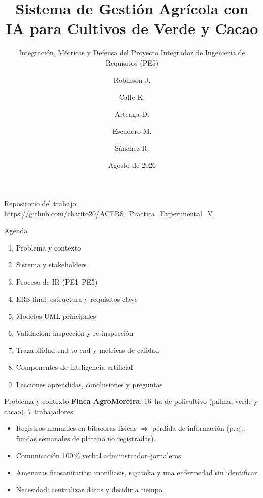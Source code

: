 \documentclass[12pt,aspectratio=169]{beamer}
\title[Defensa PFC AgroMoreira --- PE5]{Sistema de Gesti\'on Agr\'icola con IA para Cultivos de Verde y Cacao}
\subtitle{Integraci\'on, M\'etricas y Defensa del Proyecto Integrador de Ingenier\'ia de Requisitos (PE5)}
\author[Equipo ACERS]{Robinson J. \and Calle K. \and Arteaga D. \and Escudero M. \and S\'anchez R.}
\institute[UTEQ ISR-401]{Universidad T\'ecnica Estatal de Quevedo\\Ingenier\'ia de Requerimientos (ISR-401) --- 2026--2027 PPA}
\date{Agosto de 2026}
\begin{document}
\begin{frame}
  \titlepage
  \begin{center}\small
    Repositorio del trabajo:
    \url{https://github.com/charito20/ACERS_Practica_Experimental_V}
  \end{center}
\end{frame}

\begin{frame}{Agenda}
  \small
  \begin{enumerate}
    \item Problema y contexto
    \item Sistema y stakeholders
    \item Proceso de IR (PE1--PE5)
    \item ERS final: estructura y requisitos clave
    \item Modelos UML principales
    \item Validaci\'on: inspecci\'on y re-inspecci\'on
    \item Trazabilidad end-to-end y m\'etricas de calidad
    \item Componentes de inteligencia artificial
    \item Lecciones aprendidas, conclusiones y preguntas
  \end{enumerate}
\end{frame}

\begin{frame}{Problema y contexto}
  \textbf{Finca AgroMoreira}: 16~ha de policultivo (palma, verde y cacao), 7 trabajadores.
  \begin{itemize}
    \item Registros manuales en bit\'acoras f\'isicas $\Rightarrow$ p\'erdida de informaci\'on (p.\,ej., fundas semanales de pl\'atano no registradas).
    \item Comunicaci\'on 100\,\% verbal administrador--jornaleros.
    \item Amenazas fitosanitarias: moniliasis, sigatoka y una enfermedad sin identificar.
    \item Necesidad: centralizar datos y decidir a tiempo.
  \end{itemize}
\end{frame}
\end{document}
